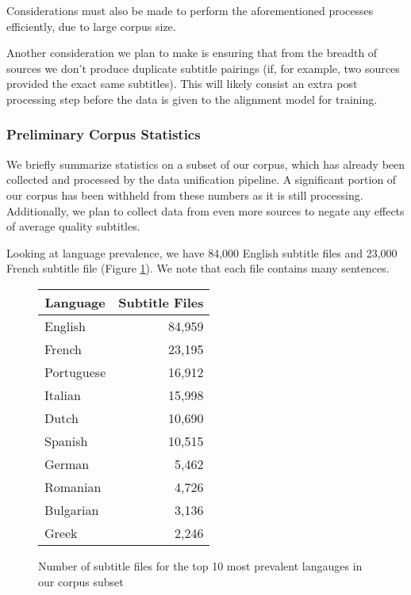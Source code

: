 \documentclass[twoside,twocolumn]{article}
\begin{document}
Considerations must also be made to perform the aforementioned processes
efficiently, due to large corpus size.

Another consideration we plan to make is ensuring that from the breadth of
sources we don't produce duplicate subtitle pairings (if, for example, two
sources provided the exact same subtitles). This will likely consist an
extra post processing step before the data is given to the alignment model for
training.


\subsubsection{Preliminary Corpus Statistics}

We briefly summarize statistics on a subset of our corpus, which has already
been collected and processed by the data unification pipeline. A
significant portion of our corpus has been withheld from these numbers as it
is still processing. Additionally, we plan to collect data from even more
sources to negate any effects of average quality subtitles.

Looking at language prevalence, we have 84,000 English subtitle files and
23,000 French subtitle file (Figure \ref{fig:language-prevalence}). We note
that each file contains many sentences.

\begin{figure}[ht]
    \centering
    \begin{tabular}{ |l|r| }
        \hline
        \multicolumn{1}{|c|}{\textbf{Language}} &
            \multicolumn{1}{|c|}{\textbf{Subtitle Files}} \\
        \hline
        English    & 84,959 \\  \hline
        French     & 23,195 \\  \hline
        Portuguese & 16,912 \\  \hline
        Italian    & 15,998 \\  \hline
        Dutch      & 10,690 \\  \hline
        Spanish    & 10,515 \\  \hline
        German     & 5,462  \\  \hline
        Romanian   & 4,726  \\  \hline
        Bulgarian  & 3,136  \\  \hline
        Greek      & 2,246  \\  \hline
    \end{tabular}

    \caption{Number of subtitle files for the top 10 most prevalent langauges
             in our corpus subset}
    \label{fig:language-prevalence}
\end{figure}
\end{document}
